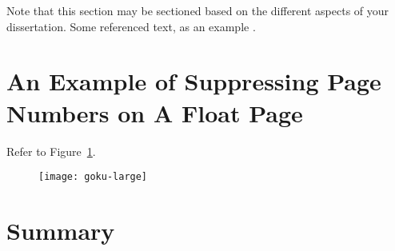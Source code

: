 Note that this section may be sectioned based on the different aspects of your dissertation.  Some referenced text, as an example \citep{Arrighi2003, WithersMartinez2012, Ebejer2016}.

\section{An Example of Suppressing Page Numbers on A Float Page}

Refer to Figure~\ref{fig:largegoku}.

\begin{figure}[!ht]
	\centering
	\texttt{[image: goku-large]}
	\caption[Short Random Caption]{\blindtext}        
	\label{fig:largegoku}
\end{figure}

\blindtext

\section{Summary}
\blindtext
